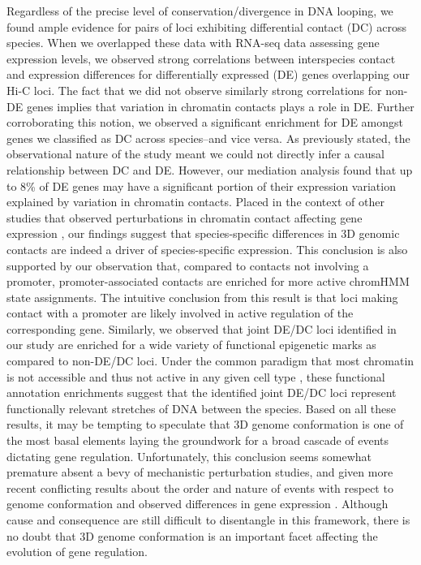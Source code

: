 Regardless of the precise level of conservation/divergence in DNA looping, we found ample evidence for pairs of loci exhibiting differential contact (DC) across species. When we overlapped these data with RNA-seq data assessing gene expression levels, we observed strong correlations between interspecies contact and expression differences for differentially expressed (DE) genes overlapping our Hi-C loci. The fact that we did not observe similarly strong correlations for non-DE genes implies that variation in chromatin contacts plays a role in DE. Further corroborating this notion, we observed a significant enrichment for DE amongst genes we classified as DC across species--and vice versa. As previously stated, the observational nature of the study meant we could not directly infer a causal relationship between DC and DE. However, our mediation analysis found that up to 8\% of DE genes may have a significant portion of their expression variation explained by variation in chromatin contacts. Placed in the context of other studies that observed perturbations in chromatin contact affecting gene expression \cite{Lupianez.2015, Siersbaek.2017}, our findings suggest that species-specific differences in 3D genomic contacts are indeed a driver of species-specific expression. This conclusion is also supported by our observation that, compared to contacts not involving a promoter, promoter-associated contacts are enriched for more active chromHMM state assignments. The intuitive conclusion from this result is that loci making contact with a promoter are likely involved in active regulation of the corresponding gene. Similarly, we observed that joint DE/DC loci identified in our study are enriched for a wide variety of functional epigenetic marks as compared to non-DE/DC loci. Under the common paradigm that most chromatin is not accessible and thus not active in any given cell type \cite{Thurman.2012}, these functional annotation enrichments suggest that the identified joint DE/DC loci represent functionally relevant stretches of DNA between the species. Based on all these results, it may be tempting to speculate that 3D genome conformation is one of the most basal elements laying the groundwork for a broad cascade of events dictating gene regulation. Unfortunately, this conclusion seems somewhat premature absent a bevy of mechanistic perturbation studies, and given more recent conflicting results about the order and nature of events with respect to genome conformation and observed differences in gene expression \cite{Jiang.2020, Ghavi-Helm.2019, Espinola.2020, Ing-Simmons.2020, Alexander.2019, Benabdallah.2019}. Although cause and consequence are still difficult to disentangle in this framework, there is no doubt that 3D genome conformation is an important facet affecting the evolution of gene regulation. 

